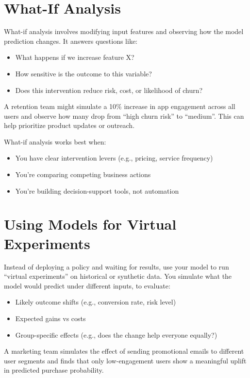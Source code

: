 \documentclass[12pt,openany, draft]{book}
\begin{document}
\section{What-If Analysis}

What-if analysis involves modifying input features and observing how the model prediction changes. It answers questions like:
\begin{itemize}
  \item What happens if we increase feature X?
  \item How sensitive is the outcome to this variable?
  \item Does this intervention reduce risk, cost, or likelihood of churn?
\end{itemize}

\begin{examplebox}
A retention team might simulate a 10\% increase in app engagement across all users and observe how many drop from ``high churn risk'' to ``medium''. This can help prioritize product updates or outreach.
\end{examplebox}

What-if analysis works best when:
\begin{itemize}
  \item You have clear intervention levers (e.g., pricing, service frequency)
  \item You're comparing competing business actions
  \item You're building decision-support tools, not automation
\end{itemize}

\section{Using Models for Virtual Experiments}

Instead of deploying a policy and waiting for results, use your model to run “virtual experiments” on historical or synthetic data. You simulate what the model would predict under different inputs, to evaluate:
\begin{itemize}
  \item Likely outcome shifts (e.g., conversion rate, risk level)
  \item Expected gains vs costs
  \item Group-specific effects (e.g., does the change help everyone equally?)
\end{itemize}

\begin{examplebox}
A marketing team simulates the effect of sending promotional emails to different user segments and finds that only low-engagement users show a meaningful uplift in predicted purchase probability.
\end{examplebox}
\end{document}
